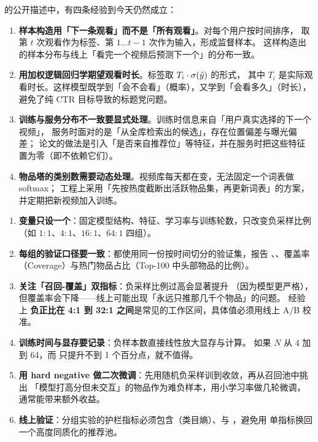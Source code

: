 \begin{casebox}
\cite{covington2016youtube} 的公开描述中，有四条经验到今天仍然成立：
\begin{enumerate}
  \item \textbf{样本构造用「下一条观看」而不是「所有观看」}。对每个用户按时间排序，
        取第 $t$ 次观看作为标签、第 $1 \dots t-1$ 次作为输入，形成监督样本。
        这样构造出的样本分布与线上「看完一个视频后预测下一个」的分布一致。
  \item \textbf{用加权逻辑回归学期望观看时长}。标签取 $T_i \cdot \operatorname{\sigma}(\hat y)$ 的形式，
        其中 $T_i$ 是实际观看时长。这样模型既学到「会不会看」（概率），又学到「会看多久」（时长），
        避免了纯 CTR 目标导致的标题党问题。
  \item \textbf{训练与服务分布不一致要显式处理}。训练时信息来自「用户真实选择的下一个视频」，
        服务时面对的是「从全库检索出的候选」，存在位置偏差与曝光偏差；
        论文的做法是引入「是否来自推荐位」等特征，并在服务时把这些特征置为零（即不依赖它们）。
  \item \textbf{物品塔的类别数需要动态处理}。视频库每天都在变，无法固定一个词表做 softmax；
        工程上采用「先按热度截断出活跃物品集，再更新词表」的方案，并定期把新视频加入训练。
\end{enumerate}
\end{casebox}

\begin{toolbox}
\begin{enumerate}
  \item \textbf{变量只设一个}：固定模型结构、特征、学习率与训练轮数，只改变负采样比例
        （如 $1:1$、$4:1$、$16:1$、$64:1$ 四组）。
  \item \textbf{每组的验证口径要一致}：都使用同一份按时间切分的验证集，报告
        、、覆盖率（Coverage）与热门物品占比（Top-100 中头部物品的比例）。
  \item \textbf{关注「召回-覆盖」双指标}：负采样比例过高会显著提升 （因为模型更严格），
        但覆盖率会下降——线上可能出现「永远只推那几千个物品」的问题。
        经验上 \textbf{负正比在 4:1 到 32:1 之间}是常见的工作区间，具体值必须用线上 A/B 校准。
  \item \textbf{训练时间与显存要记录}：负样本数直接线性放大显存与计算。
        如果 $N$ 从 4 加到 64，而  只提升不到 1 个百分点，就不值得。
  \item \textbf{用 hard negative 做二次微调}：先用随机负采样训到收敛，再从召回池中挑出
        「模型打高分但未交互」的物品作为难负样本，用小学习率做几轮微调，通常能带来额外收益。
  \item \textbf{线上验证}：分组实验的护栏指标必须包含（类目熵）、与
        ，避免用  单指标换回一个高度同质化的推荐池。
\end{enumerate}
\end{toolbox}

